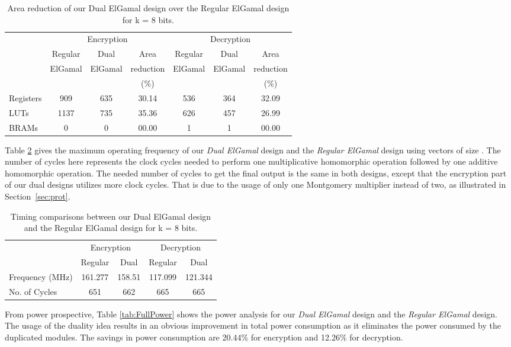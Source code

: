 \documentclass[conference]{IEEEtran}
\begin{document}
 
\begin{table}[b]
  \centering
  \caption{Area reduction of our Dual ElGamal design over the Regular ElGamal design for k = 8 bits.}
    \tabcolsep=0.11cm 
\begin{tabular}{|l||c|c|c||c|c|c|}
    \toprule
                    & \multicolumn{3}{c}{Encryption}  & \multicolumn{3}{c}{Decryption} \vline \\
    & Regular & Dual    & Area      & Regular & Dual    & Area      \\
    & ElGamal & ElGamal & reduction & ElGamal & ElGamal & reduction \\
    &         &         &   (\%)    &         &         &   (\%) \\
    \midrule
    Registers & 909   & 635   & 30.14 & 536   & 364   & 32.09 \\
    LUTs      & 1137  & 735   & 35.36 & 626   & 457   & 26.99 \\
    BRAMs     & 0     & 0     & 00.00 & 1     & 1     & 00.00 \\
    \bottomrule 
    \end{tabular}\label{tab:FullRes}\end{table}
Table \ref{tab:FullTiming} gives the maximum operating frequency of our \textit{Dual ElGamal} design and the \textit{Regular ElGamal} design using vectors of size . The number of cycles here represents the clock cycles needed to perform one multiplicative homomorphic operation followed by one additive homomorphic operation. The needed number of cycles to get the final output is the same in both designs, except that the encryption part of our dual designs utilizes more clock cycles. That is due to the usage of only one Montgomery multiplier instead of two, as illustrated in Section~\ref{sec:prot}. 

\begin{table}[t]
  \centering
  \caption{Timing comparisons between our Dual ElGamal design and the Regular ElGamal design for k = 8 bits.}
    \tabcolsep=0.11cm 
\begin{tabular}{|l||c|c||c|c|}
    \toprule
                    & \multicolumn{2}{c}{Encryption }  & \multicolumn{2}{c}{Decryption} \vline \\
                    & Regular & Dual    & Regular & Dual \\
\midrule
    Frequency (MHz) & 161.277 & 158.51  & 117.099 & 121.344 \\
    No. of Cycles   & 651     & 662     & 665     & 665 \\
\bottomrule
    \end{tabular}\label{tab:FullTiming}\end{table}
From power prospective, Table \ref{tab:FullPower} shows the power analysis for our \textit{Dual ElGamal} design and the \textit{Regular ElGamal} design. The usage of the duality idea results in an obvious improvement in total power consumption as it eliminates the power consumed by the duplicated modules. The savings in power consumption are 20.44\% for encryption and 12.26\% for decryption. 
\end{document}

